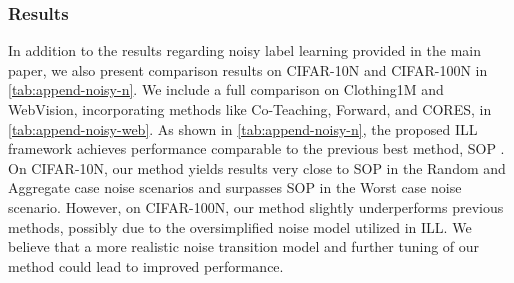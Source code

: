 \begin{table}[h!]
\centering
\caption{Hyper-parameters for \textbf{partial label learning} used in experiments.}
\label{tab:append-param-pll}
\end{table}






\subsubsection{Results}

In addition to the results regarding noisy label learning provided in the main paper, we also present comparison results on CIFAR-10N and CIFAR-100N \citep{wei2021learning} in \cref{tab:append-noisy-n}. We include a full comparison on Clothing1M and WebVision, incorporating methods like Co-Teaching, Forward, and CORES, in \cref{tab:append-noisy-web}. 
As shown in \cref{tab:append-noisy-n}, the proposed ILL framework achieves performance comparable to the previous best method, SOP \citep{sopliu22w}.
On CIFAR-10N, our method yields results very close to SOP in the Random and Aggregate case noise scenarios and surpasses SOP in the Worst case noise scenario. 
However, on CIFAR-100N, our method slightly underperforms previous methods, possibly due to the oversimplified noise model utilized in ILL. 
We believe that a more realistic noise transition model and further tuning of our method could lead to improved performance.










